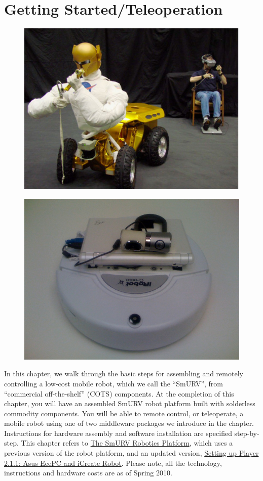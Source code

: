 
\chapter{Getting Started/Teleoperation}
\label{sec:getting_started}

\begin{figure}[!h]
\centering
\includegraphics[width=1.0\columnwidth]{figures/2_teleop.jpg}
\end{figure}

\newpage

\begin{figure}
\includegraphics[width=0.5\columnwidth]{figures/2_teaser.jpg}
\end{figure}

In this chapter, we walk through the basic steps for assembling and remotely controlling a low-cost mobile robot, which we call the ``SmURV'', from ``commercial off-the-shelf'' (COTS) components.  At the completion of this chapter, you will have an assembled SmURV robot platform built with solderless commodity components. You will be able to remote control, or teleoperate, a mobile robot using one of two middleware packages we introduce in the chapter.  Instructions for hardware assembly and software installation are specified step-by-step. This chapter refers to \href{http://robotics.cs.brown.edu/projects/smurv}{The SmURV Robotics Platform}, which uses a previous version of the robot platform, and an updated version, \href{http://robotics.cs.brown.edu/projects/player\_icreate}{Setting up Player 2.1.1: Asus EeePC and iCreate Robot}. Please note, all the technology, instructions and hardware costs are as of Spring 2010.

